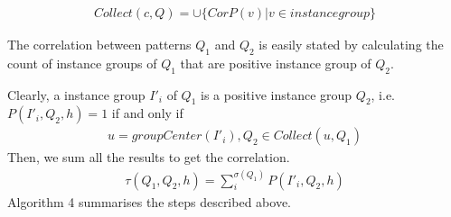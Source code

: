\begin{align}
	Collect(c,Q)=\cup \{CorP(v)|v\in instance group\}
\end{align}

 The correlation between patterns $Q_1$ and $Q_2$ is easily stated by calculating the count of instance groups of $Q_1$ that are positive instance group of $Q_2$.
\par Clearly, a instance group $I'_i$ of $Q_1$ is a positive instance group $Q_2$, i.e. $P(I'_i,Q_2,h)=1$ if and only if
\begin{align}
	u=groupCenter(I'_i), Q_2\in Collect(u,Q_1)
\end{align}
Then, we sum all the results to get the correlation.
\begin{align}
	\tau(Q_1,Q_2,h)=\sum_i^{\sigma(Q_1)} P(I'_i,Q_2,h)
\end{align}
Algorithm 4 summarises the steps described above.

